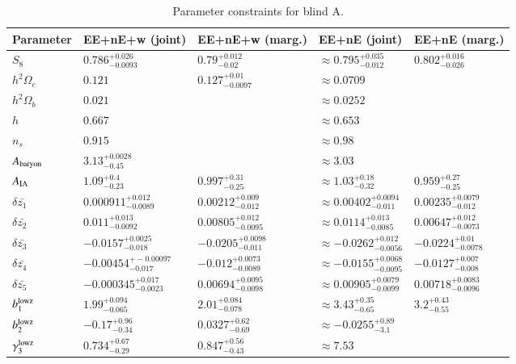 \begin{table}
\begin{center}
\caption{Parameter constraints for blind A. }
\begin{tabular}{lllll}
    \toprule
    Parameter             & EE+nE+w (joint)  & EE+nE+w (marg.)  & EE+nE (joint)  & EE+nE (marg.) \\
    \midrule
$S_8     $& $0.786^{+0.026}_{-0.0093}$ & $0.79^{+0.012}_{-0.02}$& $\approx 0.795^{+0.035}_{-0.012}$ & $0.802^{+0.016}_{-0.026}$\\
$h^2\Omega_c$& $0.121$ & $0.127^{+0.01}_{-0.0097}$& $\approx 0.0709$ & \\
$h^2\Omega_b$& $0.021$ & & $\approx 0.0252$ & \\
$h       $& $0.667$ & & $\approx 0.653$ & \\
$n_s     $& $0.915$ & & $\approx 0.98$ & \\
\midrule
$A_{\rm baryon}$& $3.13^{+0.0028}_{-0.45}$ & & $\approx 3.03$ & \\
$A_{\rm IA}$& $1.09^{+0.4}_{-0.23}$ & $0.997^{+0.31}_{-0.25}$& $\approx 1.03^{+0.18}_{-0.32}$ & $0.959^{+0.27}_{-0.25}$\\
$\delta \bar{z_1}$& $0.000911^{+0.012}_{-0.0089}$ & $0.00212^{+0.009}_{-0.012}$& $\approx 0.00402^{+0.0094}_{-0.011}$ & $0.00235^{+0.0079}_{-0.012}$\\
$\delta \bar{z_2}$& $0.011^{+0.013}_{-0.0092}$ & $0.00805^{+0.012}_{-0.0095}$& $\approx 0.0114^{+0.013}_{-0.0085}$ & $0.00647^{+0.012}_{-0.0073}$\\
$\delta \bar{z_3}$& $-0.0157^{+0.0025}_{-0.018}$ & $-0.0205^{+0.0098}_{-0.011}$& $\approx -0.0262^{+0.012}_{-0.0056}$ & $-0.0224^{+0.01}_{-0.0078}$\\
$\delta \bar{z_4}$& $-0.00454^{+-0.00097}_{-0.017}$ & $-0.012^{+0.0073}_{-0.0089}$& $\approx -0.0155^{+0.0068}_{-0.0095}$ & $-0.0127^{+0.007}_{-0.008}$\\
$\delta \bar{z_5}$& $-0.000345^{+0.017}_{-0.0023}$ & $0.00694^{+0.0095}_{-0.0098}$& $\approx 0.00905^{+0.0079}_{-0.0099}$ & $0.00718^{+0.0083}_{-0.0096}$\\
$b_1^{\rm lowz}$& $1.99^{+0.094}_{-0.065}$ & $2.01^{+0.084}_{-0.078}$& $\approx 3.43^{+0.35}_{-0.65}$ & $3.2^{+0.43}_{-0.55}$\\
$b_2^{\rm lowz}$& $-0.17^{+0.96}_{-0.34}$ & $0.0327^{+0.62}_{-0.69}$& $\approx -0.0255^{+0.89}_{-3.1}$ & \\
$\gamma_3^{\rm lowz}$& $0.734^{+0.67}_{-0.29}$ & $0.847^{+0.56}_{-0.43}$& $\approx 7.53$ & \\

\end{tabular}
\end{center}
\end{table}
